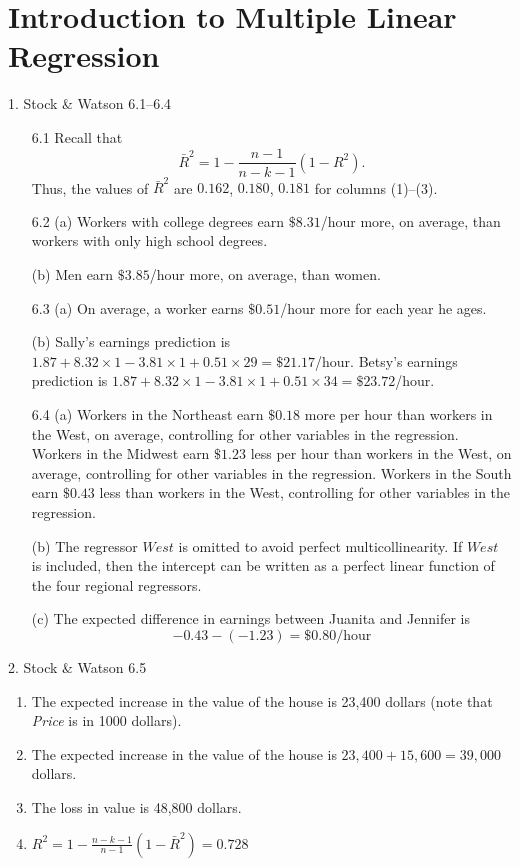 \documentclass[12pt]{article}
\begin{document}
\section{Introduction to Multiple Linear Regression}

1. Stock \& Watson 6.1--6.4
\begin{itemize}
  \item[6.1] Recall that 
  \begin{equation*}
    \bar R^2=1-\frac{n-1}{n-k-1}(1-R^2).
  \end{equation*}
  Thus, the values of $\bar R^2$ are $0.162$, $0.180$, $0.181$ for columns (1)--(3).
  
  \item[6.2] (a) Workers with college degrees earn $\$8.31$/hour more, on average, than workers with only high school degrees. 
  
  (b) Men earn $\$3.85$/hour more, on average, than women.
  
  \item[6.3] (a) On average, a worker earns $\$0.51$/hour more for each year he ages.
  
  (b) Sally's earnings prediction is $1.87+8.32\times1-3.81\times1+0.51\times29=\$21.17$/hour.
  Betsy's earnings prediction is $1.87+8.32\times1-3.81\times1+0.51\times34=\$23.72$/hour.
  
  \item[6.4] (a) Workers in the Northeast earn $\$0.18$ more per hour than workers in the West, on average, controlling for other variables in the regression.
  Workers in the Midwest earn $\$1.23$ less per hour than workers in the West, on average, controlling for other variables in the regression.
  Workers in the South earn $\$0.43$ less than workers in the West, controlling for other variables in the regression.
  
  (b) The regressor $\mathit{West}$ is omitted to avoid perfect multicollinearity.
  If $\mathit{West}$ is included, then the intercept can be written as a perfect linear function of the four regional regressors.
  
  (c) The expected difference in earnings between Juanita and Jennifer is 
  \begin{equation*}
    -0.43-(-1.23)=\$0.80\text{/hour}
  \end{equation*}
\end{itemize}


2. Stock \& Watson 6.5
\begin{enumerate}
\item The expected increase in the value of the house is 23,400 dollars (note that \textit{Price} is in 1000 dollars).
\item The expected increase in the value of the house is $23,400 + 15,600 = 39,000$ dollars.
\item The loss in value is 48,800 dollars.
\item $R^{2}=1-\frac{n-k-1}{n-1}\left(1-\bar{R}^{2}\right)=0.728$
\end{enumerate}
\end{document}
